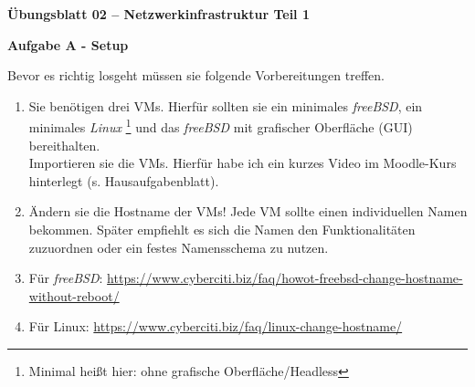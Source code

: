\documentclass[paper=a4,fontsize=11pt]{scrartcl}%
\begin{document}
\begin{center}
\Large{\textbf{Übungsblatt 02 -- Netzwerkinfrastruktur Teil 1}}\\
\end{center}

\begin{center}\Large{\textbf{Aufgabe A - Setup}}\end{center}
Bevor es richtig losgeht müssen sie folgende Vorbereitungen treffen.
\begin{enumerate}
	\item Sie benötigen drei VMs. Hierfür sollten sie ein minimales \emph{freeBSD}, ein minimales \emph{Linux} \footnote{Minimal heißt hier: ohne grafische Oberfläche/Headless} und das \emph{freeBSD} mit grafischer Oberfläche (GUI) bereithalten. \\
Importieren sie die VMs. Hierfür habe ich ein kurzes Video im Moodle-Kurs hinterlegt (s. Hausaufgabenblatt).
	\item Ändern sie die Hostname der VMs! Jede VM sollte einen individuellen Namen bekommen. Später empfiehlt es sich die Namen den Funktionalitäten zuzuordnen oder ein festes Namensschema zu nutzen. 
	 \item Für \emph{freeBSD}: \url{https://www.cyberciti.biz/faq/howot-freebsd-change-hostname-without-reboot/}
	 \item Für Linux: \url{https://www.cyberciti.biz/faq/linux-change-hostname/}
\end{enumerate}
	
\end{document}
